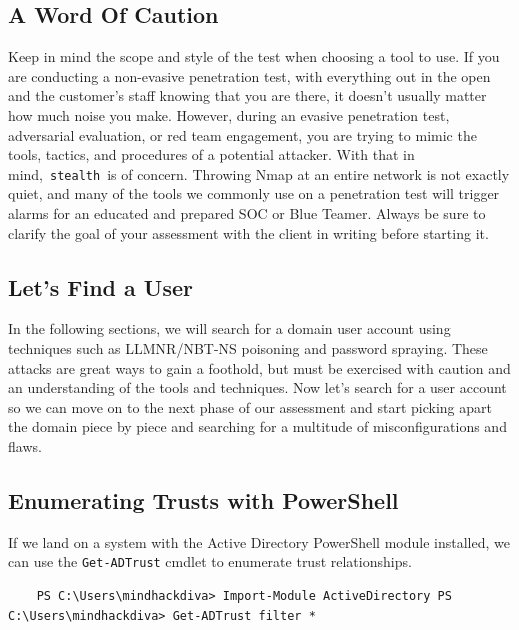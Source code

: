 \subsection{A Word Of Caution}

Keep in mind the scope and style of the test when choosing a tool to use. If you are conducting a non-evasive penetration test, with everything out in the open and the customer's staff knowing that you are there, it doesn't usually matter how much noise you make. However, during an evasive penetration test, adversarial evaluation, or red team engagement, you are trying to mimic the tools, tactics, and procedures of a potential attacker. With that in mind, \verb|stealth| is of concern. Throwing Nmap at an entire network is not exactly quiet, and many of the tools we commonly use on a penetration test will trigger alarms for an educated and prepared SOC or Blue Teamer. Always be sure to clarify the goal of your assessment with the client in writing before starting it.

\subsection{Let’s Find a User}

In the following sections, we will search for a domain user account using techniques such as LLMNR/NBT-NS poisoning and password spraying. These attacks are great ways to gain a foothold, but must be exercised with caution and an understanding of the tools and techniques. Now let's search for a user account so we can move on to the next phase of our assessment and start picking apart the domain piece by piece and searching for a multitude of misconfigurations and flaws.

 

 
\subsection{Enumerating Trusts with PowerShell}
If we land on a system with the Active Directory PowerShell module installed, we can use the \texttt{Get-ADTrust} cmdlet to enumerate trust relationships.

\begin{notebox}
\begin{verbatim}
    PS C:\Users\mindhackdiva> Import-Module ActiveDirectory PS C:\Users\mindhackdiva> Get-ADTrust filter *
\end{verbatim}
\end{notebox}

